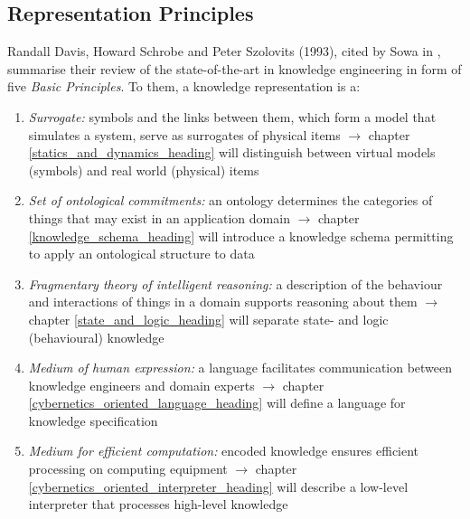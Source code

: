 %
%
%
%
%
%
%

\subsection{Representation Principles}
\label{representation_principles_heading}

Randall Davis, Howard Schrobe and Peter Szolovits (1993), cited by Sowa in
\cite[p. 134]{sowa}, summarise their review of the state-of-the-art in
knowledge engineering in form of five \emph{Basic Principles}. To them, a
knowledge representation is a:

\begin{enumerate}
    \item \emph{Surrogate:} symbols and the links between them, which form a
        model that simulates a system, serve as surrogates of physical items
        $\rightarrow$ chapter \ref{statics_and_dynamics_heading} will distinguish
        between virtual models (symbols) and real world (physical) items
    \item \emph{Set of ontological commitments:} an ontology determines the
        categories of things that may exist in an application domain
        $\rightarrow$ chapter \ref{knowledge_schema_heading} will introduce a
        knowledge schema permitting to apply an ontological structure to data
    \item \emph{Fragmentary theory of intelligent reasoning:} a description of
        the behaviour and interactions of things in a domain supports reasoning
        about them
        $\rightarrow$ chapter \ref{state_and_logic_heading} will separate state-
        and logic (behavioural) knowledge
    \item \emph{Medium of human expression:} a language facilitates
        communication between knowledge engineers and domain experts
        $\rightarrow$ chapter \ref{cybernetics_oriented_language_heading} will
        define a language for knowledge specification
    \item \emph{Medium for efficient computation:} encoded knowledge ensures
        efficient processing on computing equipment
        $\rightarrow$ chapter \ref{cybernetics_oriented_interpreter_heading} will
        describe a low-level interpreter that processes high-level knowledge
\end{enumerate}
